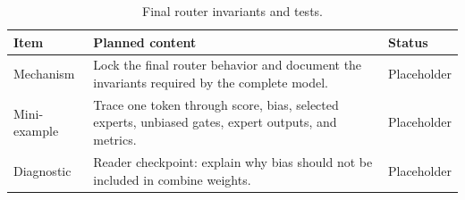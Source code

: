 \begin{table}[H]
\centering
\caption{Final router invariants and tests.}
\label{tab:ch09-chapter-summary-and-handoff}
\begin{tabularx}{\textwidth}{p{}X p{}}
\toprule
Item & Planned content & Status \\
\midrule
Mechanism & Lock the final router behavior and document the invariants required by the complete model. & Placeholder \\
Mini-example & Trace one token through score, bias, selected experts, unbiased gates, expert outputs, and metrics. & Placeholder \\
Diagnostic & Reader checkpoint: explain why bias should not be included in combine weights. & Placeholder \\
\bottomrule
\end{tabularx}
\end{table}
